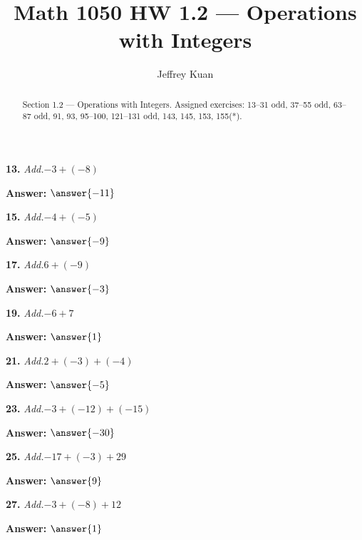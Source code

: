 \documentclass{ximera}
\author{Jeffrey Kuan}
\title{Math 1050 HW 1.2 --- Operations with Integers}
\begin{document}
\begin{abstract}
    Section 1.2 --- Operations with Integers.
    Assigned exercises: 13–31 odd, 37–55 odd, 63–87 odd, 91, 93, 95–100, 121–131 odd, 143, 145, 153, 155(*).
\end{abstract}

\maketitle

\begin{problem}
\textbf{13.} \emph{Add.}\quad $-3 + (-8)$

\textbf{Answer:} $\answer{-11}$
\end{problem}

\begin{problem}
\textbf{15.} \emph{Add.}\quad $-4 + (-5)$

\textbf{Answer:} $\answer{-9}$
\end{problem}

\begin{problem}
\textbf{17.} \emph{Add.}\quad $6 + (-9)$

\textbf{Answer:} $\answer{-3}$
\end{problem}

\begin{problem}
\textbf{19.} \emph{Add.}\quad $-6 + 7$

\textbf{Answer:} $\answer{1}$
\end{problem}

\begin{problem}
\textbf{21.} \emph{Add.}\quad $2 + (-3) + (-4)$

\textbf{Answer:} $\answer{-5}$
\end{problem}

\begin{problem}
\textbf{23.} \emph{Add.}\quad $-3 + (-12) + (-15)$

\textbf{Answer:} $\answer{-30}$
\end{problem}

\begin{problem}
\textbf{25.} \emph{Add.}\quad $-17 + (-3) + 29$

\textbf{Answer:} $\answer{9}$
\end{problem}

\begin{problem}
\textbf{27.} \emph{Add.}\quad $-3 + (-8) + 12$

\textbf{Answer:} $\answer{1}$
\end{problem}
\end{document}
